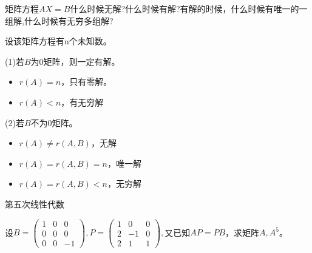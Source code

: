 \documentclass[a4paper]{report}
\begin{document}
\EX 矩阵方程$AX = B$什么时候无解?什么时候有解?有解的时候，什么时候有唯一的一组解,什么时候有无穷多组解?

\begin{jie}
设该矩阵方程有n个未知数。

(1)若$B$为0矩阵，则一定有解。
\begin{itemize}
\item $r(A)=n$，只有零解。
\item $r(A)<n$，有无穷解
\end{itemize}

(2)若$B$不为0矩阵。
\begin{itemize}
  \item $r(A)\neq r(A,B)$，无解
  \item $r(A)= r(A,B)=n$，唯一解
  \item $r(A)= r(A,B)<n$，无穷解
\end{itemize}
\end{jie}
\clearpage
\hphantom{~~}\hfill {\heiti 第五次线性代数} \hfill\hphantom{~~}

\hphantom{~~}

\setcounter{Emp}{39}
\EX 设$
B=
\begin{pmatrix}
1&0&0\\
0&0&0\\
0&0&-1
\end{pmatrix},
P=
\begin{pmatrix}
1&0&0\\
2&-1&0\\
2&1&1
\end{pmatrix},$又已知$AP=PB$，求矩阵$A,A^5$。
\end{document}
